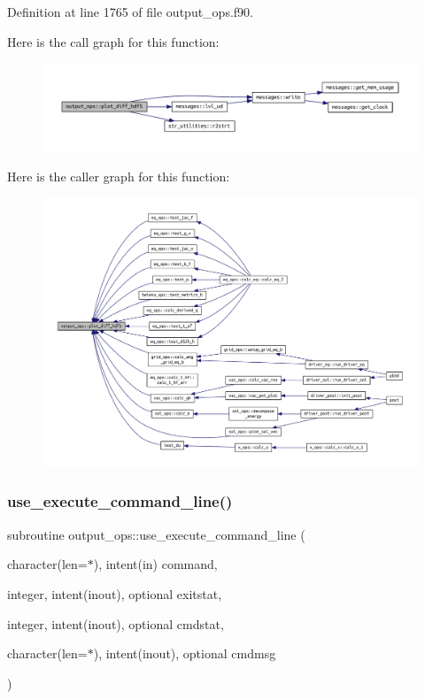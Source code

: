 Definition at line 1765 of file output\+\_\+ops.\+f90.

Here is the call graph for this function\+:
\nopagebreak
\begin{figure}[H]
\begin{center}
\leavevmode
\includegraphics[width=350pt]{namespaceoutput__ops_ab0d14194d01ab0534562eab50b37a57a_cgraph}
\end{center}
\end{figure}
Here is the caller graph for this function\+:
\nopagebreak
\begin{figure}[H]
\begin{center}
\leavevmode
\includegraphics[width=350pt]{namespaceoutput__ops_ab0d14194d01ab0534562eab50b37a57a_icgraph}
\end{center}
\end{figure}
\mbox{\label{namespaceoutput__ops_aa9e4855511b6ea16a08b3efb587bec51}} 
\subsubsection{\texorpdfstring{use\+\_\+execute\+\_\+command\+\_\+line()}{use\_execute\_command\_line()}}
{\footnotesize\ttfamily subroutine output\+\_\+ops\+::use\+\_\+execute\+\_\+command\+\_\+line (\begin{DoxyParamCaption}\item[{character(len=$\ast$), intent(in)}]{command,  }\item[{integer, intent(inout), optional}]{exitstat,  }\item[{integer, intent(inout), optional}]{cmdstat,  }\item[{character(len=$\ast$), intent(inout), optional}]{cmdmsg }\end{DoxyParamCaption})}



